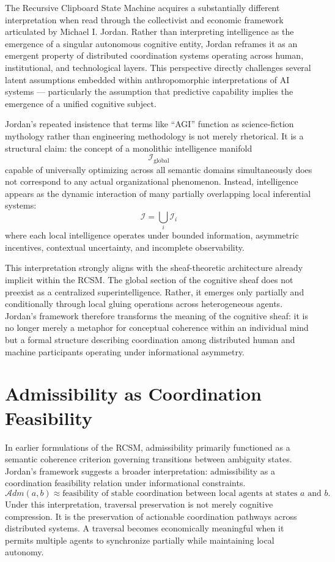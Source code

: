 \documentclass[12pt,oneside]{book}
\theoremstyle{plain}
\theoremstyle{definition}
\theoremstyle{plain}
\begin{document}
The Recursive Clipboard State Machine acquires a substantially different interpretation when read through the collectivist and economic framework articulated by Michael I. Jordan. Rather than interpreting intelligence as the emergence of a singular autonomous cognitive entity, Jordan reframes it as an emergent property of distributed coordination systems operating across human, institutional, and technological layers. This perspective directly challenges several latent assumptions embedded within anthropomorphic interpretations of AI systems --- particularly the assumption that predictive capability implies the emergence of a unified cognitive subject.

Jordan's repeated insistence that terms like ``AGI'' function as science-fiction mythology rather than engineering methodology is not merely rhetorical. It is a structural claim: the concept of a monolithic intelligence manifold
\[
\mathcal{I}_{\text{global}}
\]
capable of universally optimizing across all semantic domains simultaneously does not correspond to any actual organizational phenomenon. Instead, intelligence appears as the dynamic interaction of many partially overlapping local inferential systems:
\[
\mathcal{I} = \bigcup_i \mathcal{I}_i
\]
where each local intelligence operates under bounded information, asymmetric incentives, contextual uncertainty, and incomplete observability.

This interpretation strongly aligns with the sheaf-theoretic architecture already implicit within the RCSM. The global section of the cognitive sheaf does not preexist as a centralized superintelligence. Rather, it emerges only partially and conditionally through local gluing operations across heterogeneous agents. Jordan's framework therefore transforms the meaning of the cognitive sheaf: it is no longer merely a metaphor for conceptual coherence within an individual mind but a formal structure describing coordination among distributed human and machine participants operating under informational asymmetry.

\section{Admissibility as Coordination Feasibility}

In earlier formulations of the RCSM, admissibility primarily functioned as a semantic coherence criterion governing transitions between ambiguity states. Jordan's framework suggests a broader interpretation: admissibility as a coordination feasibility relation under informational constraints.
\[
\mathcal{A}dm(a,b) \approx \text{feasibility of stable coordination between local agents at states } a \text{ and } b.
\]
Under this interpretation, traversal preservation is not merely cognitive compression. It is the preservation of actionable coordination pathways across distributed systems. A traversal becomes economically meaningful when it permits multiple agents to synchronize partially while maintaining local autonomy.
\end{document}
